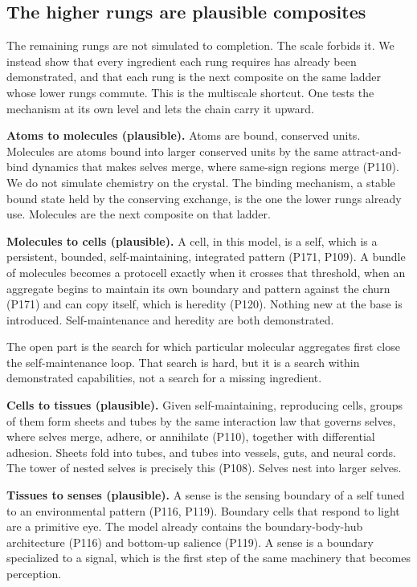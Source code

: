 \subsection{The higher rungs are plausible composites}

The remaining rungs are not simulated to completion. The scale forbids it. We instead show that every ingredient each rung requires has already been demonstrated, and that each rung is the next composite on the same ladder whose lower rungs commute. This is the multiscale shortcut. One tests the mechanism at its own level and lets the chain carry it upward.

\textbf{Atoms to molecules (plausible).} Atoms are bound, conserved units. Molecules are atoms bound into larger conserved units by the same attract-and-bind dynamics that makes selves merge, where same-sign regions merge (P110). We do not simulate chemistry on the crystal. The binding mechanism, a stable bound state held by the conserving exchange, is the one the lower rungs already use. Molecules are the next composite on that ladder.

\textbf{Molecules to cells (plausible).} A cell, in this model, is a self, which is a persistent, bounded, self-maintaining, integrated pattern (P171, P109). A bundle of molecules becomes a protocell exactly when it crosses that threshold, when an aggregate begins to maintain its own boundary and pattern against the churn (P171) and can copy itself, which is heredity (P120). Nothing new at the base is introduced. Self-maintenance and heredity are both demonstrated.

The open part is the search for which particular molecular aggregates first close the self-maintenance loop. That search is hard, but it is a search within demonstrated capabilities, not a search for a missing ingredient.

\textbf{Cells to tissues (plausible).} Given self-maintaining, reproducing cells, groups of them form sheets and tubes by the same interaction law that governs selves, where selves merge, adhere, or annihilate (P110), together with differential adhesion. Sheets fold into tubes, and tubes into vessels, guts, and neural cords. The tower of nested selves is precisely this (P108). Selves nest into larger selves.

\textbf{Tissues to senses (plausible).} A sense is the sensing boundary of a self tuned to an environmental pattern (P116, P119). Boundary cells that respond to light are a primitive eye. The model already contains the boundary-body-hub architecture (P116) and bottom-up salience (P119). A sense is a boundary specialized to a signal, which is the first step of the same machinery that becomes perception.

